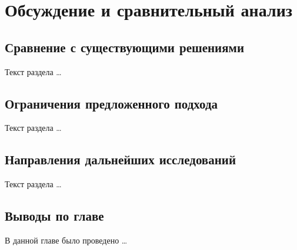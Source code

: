 \chapter{Обсуждение и сравнительный анализ}
\label{ch:chapter4}

\section{Сравнение с существующими решениями}
\label{sec:ch4:comparison}

Текст раздела \ldots

\section{Ограничения предложенного подхода}
\label{sec:ch4:limitations}

Текст раздела \ldots

\section{Направления дальнейших исследований}
\label{sec:ch4:future}

Текст раздела \ldots

\section{Выводы по главе}
\label{sec:ch4:summary}

В данной главе было проведено \ldots
